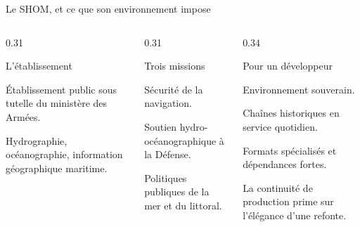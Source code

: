 \begin{frame}{Le SHOM, et ce que son environnement impose}
\begin{columns}[T]
\begin{column}{0.31\linewidth}
  \begin{block}{L'établissement}
  \small
  \begin{tightitems}
    \item Établissement public sous tutelle du ministère des Armées.
    \item Hydrographie, océanographie, information géographique maritime.
  \end{tightitems}
  \end{block}
\end{column}
\begin{column}{0.31\linewidth}
  \begin{block}{Trois missions}
  \small
  \begin{tightitems}
    \item Sécurité de la navigation.
    \item Soutien hydro-océanographique à la Défense.
    \item Politiques publiques de la mer et du littoral.
  \end{tightitems}
  \end{block}
\end{column}
\begin{column}{0.34\linewidth}
  \begin{block}{Pour un développeur}
  \small
  \begin{tightitems}
    \item Environnement souverain.
    \item Chaînes historiques en service quotidien.
    \item Formats spécialisés et dépendances fortes.
    \item La continuité de production prime sur l'élégance d'une refonte.
  \end{tightitems}
  \end{block}
\end{column}
\end{columns}
\vspace{0.45em}
\small{}
\end{frame}


